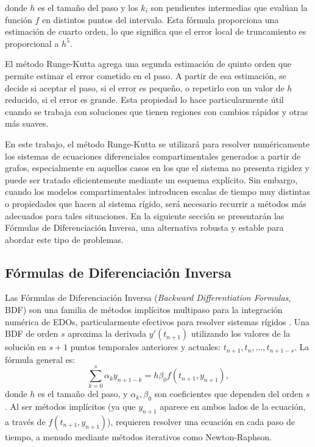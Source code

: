donde \( h \) es el tamaño del paso y los \( k_i \) son pendientes intermedias que evalúan la función \( f \) en distintos puntos del intervalo. Esta fórmula 
proporciona una estimación de cuarto orden, lo que significa que el error local de truncamiento es proporcional a \( h^5 \).

El método Runge-Kutta agrega una segunda estimación de quinto orden que permite estimar el error cometido en el paso. A partir de esa estimación, se decide si aceptar 
el paso, si el error es pequeño, o repetirlo con un valor de \( h \) reducido, si el error es grande. Esta propiedad lo hace particularmente útil cuando se trabaja 
con soluciones que tienen regiones con cambios rápidos y otras más suaves\cite{HairerNorsettWanner93}.

En este trabajo, el método Runge-Kutta se utilizará para resolver numéricamente los sistemas de ecuaciones diferenciales compartimentales generados a partir de grafos, 
especialmente en aquellos casos en los que el sistema no presenta rigidez y puede ser tratado eficientemente mediante un esquema explícito. Sin embargo, cuando los 
modelos compartimentales introducen escalas de tiempo muy distintas o propiedades que hacen al sistema rígido, será necesario recurrir a métodos más adecuados para 
tales situaciones. En la siguiente sección se presentarán las Fórmulas de Diferenciación Inversa, una alternativa robusta y estable para abordar este tipo 
de problemas.

\subsection{Fórmulas de Diferenciación Inversa}

Las Fórmulas de Diferenciación Inversa (\textit{Backward Differentiation Formulas}, BDF) son una familia de métodos implícitos multipaso para la integración numérica de 
EDOs, particularmente efectivos para resolver sistemas rígidos \cite{Gear71, HairerWanner96}. Una BDF de orden $s$ aproxima la 
derivada $y'(t_{n+1})$ utilizando los valores de la solución en $s+1$ puntos temporales anteriores y actuales: $t_{n+1}, t_n, \ldots, t_{n+1-s}$. La fórmula 
general es:
\[
\sum_{k=0}^{s} \alpha_k y_{n+1-k} = h \beta_0 f(t_{n+1}, y_{n+1}),
\]
donde $h$ es el tamaño del paso, y $\alpha_k, \beta_0$ son coeficientes que dependen del orden $s$. Al ser métodos implícitos (ya que $y_{n+1}$ aparece en ambos 
lados de la ecuación, a través de $f(t_{n+1}, y_{n+1})$), requieren resolver una ecuación en cada paso de tiempo, a menudo mediante métodos 
iterativos como Newton-Raphson\cite{BurdenFaires2011}.

